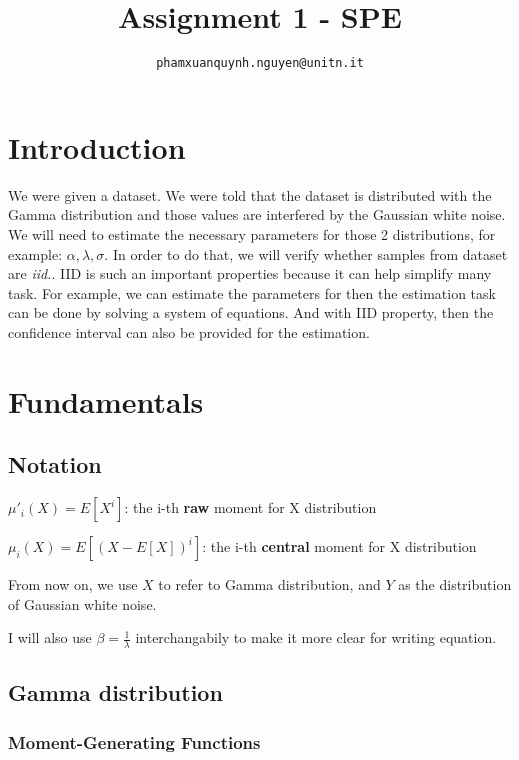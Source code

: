 \documentclass[conference]{IEEEtran}
\begin{document}
\title{Assignment 1 - SPE}

\author{
	\texttt{phamxuanquynh.nguyen@unitn.it}
}

\maketitle

\acresetall

\section{Introduction}
\label{sec:introduction}
We were given a dataset. We were told that the dataset is distributed with the Gamma distribution and those values are interfered by the Gaussian white noise. We will need to estimate the necessary parameters for those 2 distributions, for example: $\alpha, \lambda, \sigma$. In order to do that, we will verify whether samples from dataset are \textit{iid.}. IID is such an important properties because it can help simplify many task. For example, we can estimate the parameters for  then the estimation task can be done by solving a system of equations. And with IID property, then the confidence interval can also be provided for the estimation.

\section{Fundamentals}
\label{sec:fundamentals}

\subsection{Notation}
$\mu'_{i}(X) = E[X^{i}]$: the i-th \textbf{raw} moment for X distribution

$\mu_{i}(X) = E[(X - E[X])^{i}]$: the i-th \textbf{central} moment for X distribution

From now on, we use $X$ to refer to Gamma distribution, and $Y$ as the distribution of Gaussian white noise.

I will also use $\beta = \frac{1}{\lambda}$ interchangabily to make it more clear for writing equation.

\subsection{Gamma distribution}
\subsubsection{Moment-Generating Functions}
\end{document}
